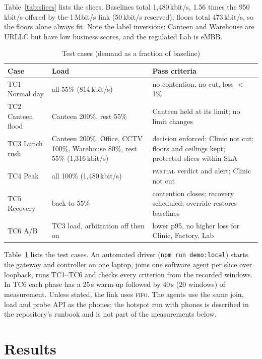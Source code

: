 \documentclass[conference]{IEEEtran}
\newcommand{\kbps}{\,kbit/s}
\begin{document}
Table~\ref{tab:slices} lists the slices. Baselines total 1{,}480\kbps{}, 1.56 times the 950\kbps{} offered by the 1\,Mbit/s link (50\kbps{} reserved); floors total 473\kbps{}, so the floors alone always fit. Note the label inversions: Canteen and Warehouse are URLLC but have low business scores, and the regulated Lab is eMBB.

\begin{table}[t]
\caption{Test cases (demand as a fraction of baseline)}
\label{tab:tcs}
\centering
\footnotesize
\setlength{\tabcolsep}{3pt}
\begin{tabular}{@{}p{1.75cm}p{3.0cm}p{3.0cm}@{}}
\toprule
Case & Load & Pass criteria \\
\midrule
TC1 Normal day & all 55\% (814\kbps{}) & no contention, no cut, loss $<$1\% \\
TC2 Canteen flood & Canteen 200\%, rest 55\% & Canteen held at its limit; no limit changes \\
TC3 Lunch rush & Canteen 200\%, Office, CCTV 100\%, Warehouse 80\%, rest 55\% (1{,}316\kbps{}) & decision enforced; Clinic not cut; floors and ceilings kept; protected slices within SLA \\
TC4 Peak & all 100\% (1{,}480\kbps{}) & \textsc{partial} verdict and alert; Clinic not cut \\
TC5 Recovery & back to 55\% & contention closes; recovery scheduled; override restores baselines \\
TC6 A/B & TC3 load, arbitration off then on & lower p95, no higher loss for Clinic, Factory, Lab \\
\bottomrule
\end{tabular}
\end{table}

Table~\ref{tab:tcs} lists the test cases. An automated driver (\texttt{npm run demo:local}) starts the gateway and controller on one laptop, joins one software agent per slice over loopback, runs TC1--TC6 and checks every criterion from the recorded windows. In TC6 each phase has a 25\,s warm-up followed by 40\,s (20 windows) of measurement. Unless stated, the link uses \textsc{fifo}. The agents use the same join, load and probe API as the phones; the hotspot run with phones is described in the repository's runbook and is not part of the measurements below.

\section{Results}
\label{sec:results}
\end{document}
